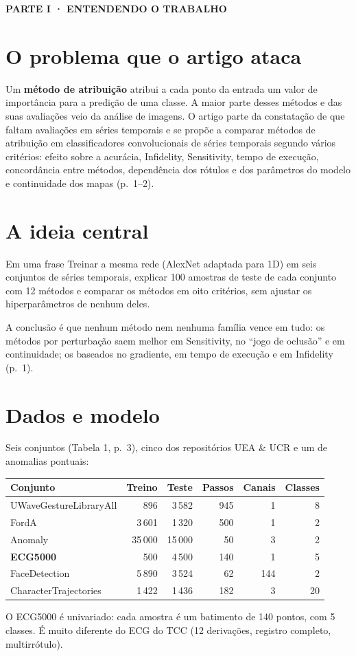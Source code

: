 \documentclass[11pt,a4paper]{article}
\newcommand{\partbar}[1]{\par\vspace{1.2em}\noindent\colorbox{black!80}{\parbox{\dimexpr\linewidth-2\fboxsep}{\color{white}\bfseries\sffamily\MakeUppercase{#1}}}\par\vspace{0.4em}}
\begin{document}
\partbar{Parte I · Entendendo o trabalho}

\section{O problema que o artigo ataca}
Um \textbf{método de atribuição} atribui a cada ponto da entrada um valor de importância para a predição de uma classe. A maior parte desses métodos e das suas avaliações veio da análise de imagens. O artigo parte da constatação de que faltam avaliações em séries temporais e se propõe a comparar métodos de atribuição em classificadores convolucionais de séries temporais segundo vários critérios: efeito sobre a acurácia, Infidelity, Sensitivity, tempo de execução, concordância entre métodos, dependência dos rótulos e dos parâmetros do modelo e continuidade dos mapas (p.~1--2).

\section{A ideia central}
\begin{infobox}[note]{Em uma frase}
Treinar a mesma rede (AlexNet adaptada para 1D) em seis conjuntos de séries temporais, explicar 100 amostras de teste de cada conjunto com 12 métodos e comparar os métodos em oito critérios, sem ajustar os hiperparâmetros de nenhum deles.
\end{infobox}
A conclusão é que nenhum método nem nenhuma família vence em tudo: os métodos por perturbação saem melhor em Sensitivity, no ``jogo de oclusão'' e em continuidade; os baseados no gradiente, em tempo de execução e em Infidelity (p.~1).

\section{Dados e modelo}
Seis conjuntos (Tabela 1, p.~3), cinco dos repositórios UEA \& UCR e um de anomalias pontuais:
\begin{center}\small
\begin{tabular}{lrrrrr}
\toprule
\textbf{Conjunto} & \textbf{Treino} & \textbf{Teste} & \textbf{Passos} & \textbf{Canais} & \textbf{Classes} \\
\midrule
UWaveGestureLibraryAll & 896 & 3\,582 & 945 & 1 & 8 \\
FordA & 3\,601 & 1\,320 & 500 & 1 & 2 \\
Anomaly & 35\,000 & 15\,000 & 50 & 3 & 2 \\
\textbf{ECG5000} & 500 & 4\,500 & 140 & 1 & 5 \\
FaceDetection & 5\,890 & 3\,524 & 62 & 144 & 2 \\
CharacterTrajectories & 1\,422 & 1\,436 & 182 & 3 & 20 \\
\bottomrule
\end{tabular}
\end{center}
O ECG5000 é univariado: cada amostra é um batimento de 140 pontos, com 5 classes. É muito diferente do ECG do TCC (12 derivações, registro completo, multirrótulo).
\end{document}
